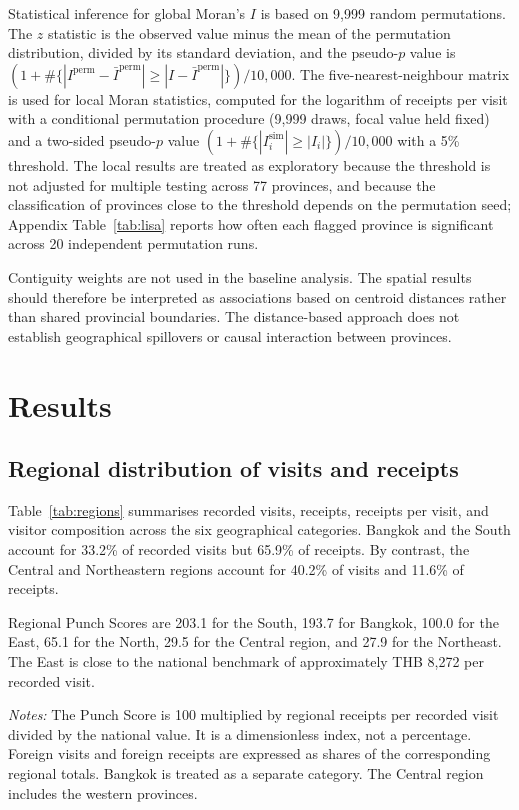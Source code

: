 \documentclass[11pt,a4paper]{article}
\begin{document}
Statistical inference for global Moran's $I$ is based on 9,999 random permutations. The $z$ statistic is the observed value minus the mean of the permutation distribution, divided by its standard deviation, and the pseudo-$p$ value is $(1+\#\{|I^{\mathrm{perm}}-\bar I^{\mathrm{perm}}|\ge|I-\bar I^{\mathrm{perm}}|\})/10{,}000$. The five-nearest-neighbour matrix is used for local Moran statistics, computed for the logarithm of receipts per visit with a conditional permutation procedure (9,999 draws, focal value held fixed) and a two-sided pseudo-$p$ value $(1+\#\{|I_i^{\mathrm{sim}}|\ge|I_i|\})/10{,}000$ with a 5\% threshold. The local results are treated as exploratory because the threshold is not adjusted for multiple testing across 77 provinces, and because the classification of provinces close to the threshold depends on the permutation seed; Appendix Table~\ref{tab:lisa} reports how often each flagged province is significant across 20 independent permutation runs.

Contiguity weights are not used in the baseline analysis. The spatial results should therefore be interpreted as associations based on centroid distances rather than shared provincial boundaries. The distance-based approach does not establish geographical spillovers or causal interaction between provinces.

\section{Results}
\subsection{Regional distribution of visits and receipts}
Table~\ref{tab:regions} summarises recorded visits, receipts, receipts per visit, and visitor composition across the six geographical categories. Bangkok and the South account for 33.2\% of recorded visits but 65.9\% of receipts. By contrast, the Central and Northeastern regions account for 40.2\% of visits and 11.6\% of receipts.

Regional Punch Scores are 203.1 for the South, 193.7 for Bangkok, 100.0 for the East, 65.1 for the North, 29.5 for the Central region, and 27.9 for the Northeast. The East is close to the national benchmark of approximately THB 8,272 per recorded visit.

\begin{table}[t]\centering\scriptsize
\caption{Tourism receipts, recorded visits and Punch Score by region, 2024}\label{tab:regions}
\resizebox{\textwidth}{!}{}\par\smallskip
\parbox{\textwidth}{\scriptsize\emph{Notes:} The Punch Score is 100 multiplied by regional receipts per recorded visit divided by the national value. It is a dimensionless index, not a percentage. Foreign visits and foreign receipts are expressed as shares of the corresponding regional totals. Bangkok is treated as a separate category. The Central region includes the western provinces.}
\end{table}
\end{document}
